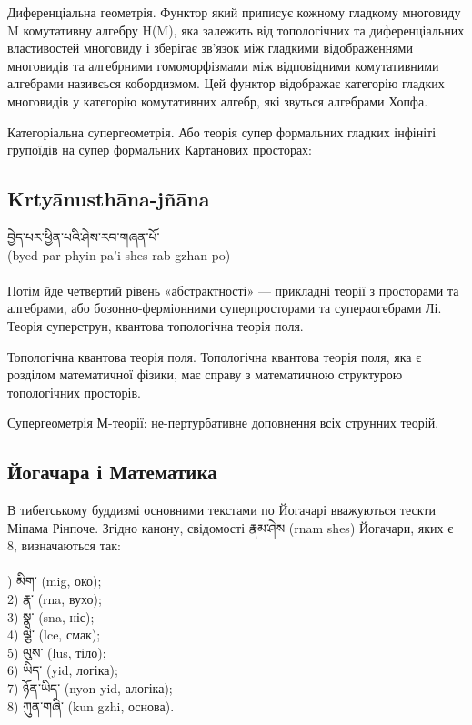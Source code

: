 Диференціальна геометрія. Функтор який приписує кожному гладкому
многовиду M комутативну алгебру H(M), яка залежить від топологічних
та диференціальних властивостей многовиду і зберігає зв'язок між гладкими
відображеннями многовидів та алгебрними гомоморфізмами між відповідними
комутативними алгебрами називєься кобордизмом. Цей функтор відображає
категорію гладких многовидів у категорію комутативних алгебр,
які звуться алгебрами Хопфа.

Категоріальна супергеометрія. Або теорія супер формальних гладких інфініті групоїдів на
супер формальних Картанових просторах:

\subsection*{Krtyānusthāna-jñāna}

\ti བྱེད་པར་ཕྱིན་པའི་ཤེས་རབ་གཞན་པོ་ 
\\
\ua (byed par phyin pa'i shes rab gzhan po)\\
\\
Потім йде четвертий рівень «абстрактності» --- прикладні теорії з
просторами та алгебрами, або бозонно-ферміонними суперпросторами
та супераогебрами Лі. Теорія суперструн, квантова топологічна теорія поля.

Топологічна квантова теорія поля. Топологічна квантова теорія поля,
яка є розділом математичної фізики, має справу з математичною структурою
топологічних просторів.

Супергеометрія М-теорії: не-пертурбативне доповнення всіх струнних теорій.

\newpage
\subsection*{Йогачара і Математика}

В тибетському буддизмі основними текстами по Йогачарі вважуються тескти Міпама Рінпоче.
Згідно канону, свідомості \ti རྣམ་ཤེས  \ua (rnam shes) Йогачари, яких є 8, визначаються так:
\\
\\
\footnotesize
{}) \ti མིག་ \ua (mig, око);\\
2) \ti རྣ་ \ua (rna, вухо);\\
3) \ti སྣ་ \ua (sna, ніс);\\
4) \ti ལྕེ་ \ua (lce, смак);\\
5) \ti ལུས་ \ua (lus, тіло);\\
6) \ti ཡིད་ \ua (yid, логіка);\\
7) \ti ཉོན་ཡིད་  \ua (nyon yid, алогіка);\\
8) \ti ཀུན་གཞི་  \ua (kun gzhi, основа).\\
\normalsize

